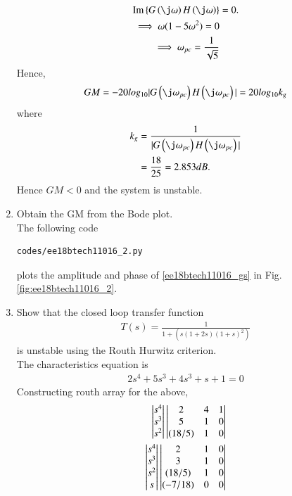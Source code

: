 \begin{enumerate}[label=\thesection.\arabic*.,ref=\thesection.\theenumi]
\begin{align}
\text{Im}\cbrak{G\brak{\j\omega}H\brak{\j\omega}}&=0. 
\\
\implies\omega(1-5\omega^2)=0
\\
\implies\omega_{pc} = \frac{1}{\sqrt{5}}
\end{align}
Hence, 
\begin{align}
GM = -20log_{10}|G\brak{\j\omega_{pc}}H\brak{\j\omega_{pc}}| = 20log_{10}k_{g}
\end{align}
where 
\begin{align}
k_{g}&=\frac{1}{|G\brak{\j\omega_{pc}}H\brak{\j\omega_{pc}}|}
\\
&= \frac{ 18}{25} = 2.853dB.
\end{align}
%
Hence $GM < 0$ and the system is unstable.
%
\item Obtain the GM from the Bode plot.
\\
\solution The following code 
\begin{lstlisting}
codes/ee18btech11016_2.py
\end{lstlisting}
%
plots the amplitude and phase of \eqref{ee18btech11016_gs} in Fig. \ref{fig:ee18btech11016_2}.
%
\item Show that the closed loop transfer function 
\begin{align}
T(s) = \frac{1}{1 + (s(1+2s)(1+s)^2)}
\end{align}
%
is unstable using the Routh Hurwitz criterion.
\\
\solution 
The characteristics equation is 
\begin{align}
2s^4 + 5s^3 + 4s^3 + s + 1 = 0 
\end{align}
Constructing routh array for the above,
\begin{align}
\mydet{s^4\\s^3\\s^2}
\mydet{2 & 4 & 1 \\ 5 & 1 & 0 \\ (18/5) & 1 & 0}
\\
\mydet{s^4\\s^3\\s^2\\s}
\mydet{2 & 1 & 0 \\ 3 & 1 & 0 \\ (18/5) & 1 & 0 \\ (-7/18) & 0 & 0}

\end{align}
\end{enumerate}
